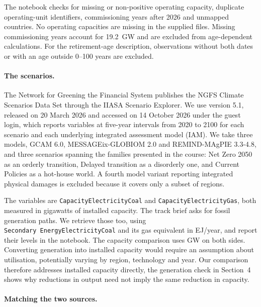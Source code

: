 \documentclass[11pt,a4paper]{article}
\begin{document}
The notebook checks for missing or non-positive operating capacity, duplicate operating-unit identifiers, commissioning years after 2026 and unmapped countries. No operating capacities are missing in the supplied files. Missing commissioning years account for 19.2~GW and are excluded from age-dependent calculations. For the retirement-age description, observations without both dates or with an age outside 0--100 years are excluded.

\paragraph{The scenarios.}

The Network for Greening the Financial System publishes the NGFS Climate Scenarios Data Set through the IIASA Scenario Explorer. We use version 5.1, released on 20 March 2026 and accessed on 14 October 2026 under the guest login, which reports variables at five-year intervals from 2020 to 2100 for each scenario and each underlying integrated assessment model (IAM). We take three models, GCAM 6.0, MESSAGEix-GLOBIOM 2.0 and REMIND-MAgPIE 3.3-4.8, and three scenarios spanning the families presented in the course: Net Zero 2050 as an orderly transition, Delayed transition as a disorderly one, and Current Policies as a hot-house world. A fourth model variant reporting integrated physical damages is excluded because it covers only a subset of regions.

The variables are \texttt{Capacity\textbar{}Electricity\textbar{}Coal} and \texttt{Capacity\textbar{}Electricity\textbar{}Gas}, both measured in gigawatts of installed capacity. The track brief asks for fossil generation paths. We retrieve those too, using \texttt{Secondary\ Energy\textbar{}Electricity\textbar{}Coal} and its gas equivalent in EJ/year, and report their levels in the notebook. The capacity comparison uses GW on both sides. Converting generation into installed capacity would require an assumption about utilisation, potentially varying by region, technology and year. Our comparison therefore addresses installed capacity directly, the generation check in Section~4 shows why reductions in output need not imply the same reduction in capacity.

\paragraph{Matching the two sources.}
\end{document}
